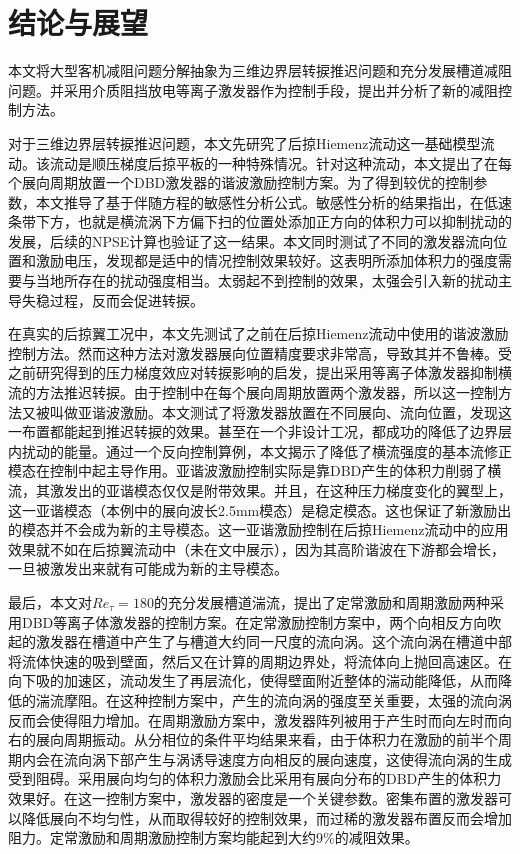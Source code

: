 \chapter{结论与展望}
本文将大型客机减阻问题分解抽象为三维边界层转捩推迟问题和充分发展槽道减阻问题。并采用介质阻挡放电等离子激发器作为控制手段，提出并分析了新的减阻控制方法。

对于三维边界层转捩推迟问题，本文先研究了后掠Hiemenz流动这一基础模型流动。该流动是顺压梯度后掠平板的一种特殊情况。针对这种流动，本文提出了在每个展向周期放置一个DBD激发器的谐波激励控制方案。为了得到较优的控制参数，本文推导了基于伴随方程的敏感性分析公式。敏感性分析的结果指出，在低速条带下方，也就是横流涡下方偏下扫的位置处添加正方向的体积力可以抑制扰动的发展，后续的NPSE计算也验证了这一结果。本文同时测试了不同的激发器流向位置和激励电压，发现都是适中的情况控制效果较好。这表明所添加体积力的强度需要与当地所存在的扰动强度相当。太弱起不到控制的效果，太强会引入新的扰动主导失稳过程，反而会促进转捩。

在真实的后掠翼工况中，本文先测试了之前在后掠Hiemenz流动中使用的谐波激励控制方法。然而这种方法对激发器展向位置精度要求非常高，导致其并不鲁棒。受之前研究得到的压力梯度效应对转捩影响的启发，提出采用等离子体激发器抑制横流的方法推迟转捩。由于控制中在每个展向周期放置两个激发器，所以这一控制方法又被叫做亚谐波激励。本文测试了将激发器放置在不同展向、流向位置，发现这一布置都能起到推迟转捩的效果。甚至在一个非设计工况，都成功的降低了边界层内扰动的能量。通过一个反向控制算例，本文揭示了降低了横流强度的基本流修正模态在控制中起主导作用。亚谐波激励控制实际是靠DBD产生的体积力削弱了横流，其激发出的亚谐模态仅仅是附带效果。并且，在这种压力梯度变化的翼型上，这一亚谐模态（本例中的展向波长2.5mm模态）是稳定模态。这也保证了新激励出的模态并不会成为新的主导模态。这一亚谐激励控制在后掠Hiemenz流动中的应用效果就不如在后掠翼流动中（未在文中展示），因为其高阶谐波在下游都会增长，一旦被激发出来就有可能成为新的主导模态。

最后，本文对$Re_\tau=180$的充分发展槽道湍流，提出了定常激励和周期激励两种采用DBD等离子体激发器的控制方案。在定常激励控制方案中，两个向相反方向吹起的激发器在槽道中产生了与槽道大约同一尺度的流向涡。这个流向涡在槽道中部将流体快速的吸到壁面，然后又在计算的周期边界处，将流体向上抛回高速区。在向下吸的加速区，流动发生了再层流化，使得壁面附近整体的湍动能降低，从而降低的湍流摩阻。在这种控制方案中，产生的流向涡的强度至关重要，太强的流向涡反而会使得阻力增加。在周期激励方案中，激发器阵列被用于产生时而向左时而向右的展向周期振动。从分相位的条件平均结果来看，由于体积力在激励的前半个周期内会在流向涡下部产生与涡诱导速度方向相反的展向速度，这使得流向涡的生成受到阻碍。采用展向均匀的体积力激励会比采用有展向分布的DBD产生的体积力效果好。在这一控制方案中，激发器的密度是一个关键参数。密集布置的激发器可以降低展向不均匀性，从而取得较好的控制效果，而过稀的激发器布置反而会增加阻力。定常激励和周期激励控制方案均能起到大约9\%的减阻效果。

